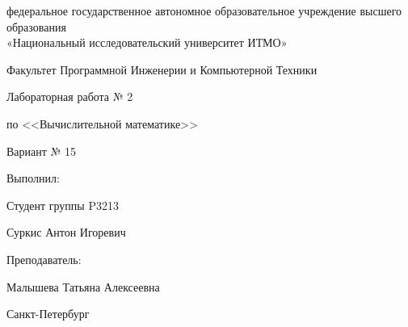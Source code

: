 \begin{titlepage}
    \begin{center}
        федеральное государственное автономное образовательное учреждение высшего образования\\
        «Национальный исследовательский университет ИТМО»

        \bigskip

        Факультет Программной Инженерии и Компьютерной Техники

        \vfill

        {\Large
        Лабораторная работа № 2

        по <<Вычислительной математике>>

        \bigskip

        Вариант № 15
        }
    \end{center}

    \bigskip

    \begin{flushright}
        Выполнил:

        Студент группы P3213

        Суркис Антон Игоревич

        \bigskip

        Преподаватель:

        Малышева Татьяна Алексеевна
    \end{flushright}

    \vfill

    \begin{center}
        Санкт-Петербург

        \the\year
    \end{center}
\end{titlepage}
